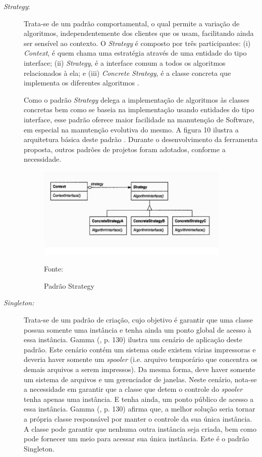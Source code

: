 \begin{description}
\item[\textit{Strategy}:]
Trata-se de um padrão comportamental, o qual permite a variação de algoritmos, independentemente dos clientes que os usam, facilitando ainda ser sensível ao contexto. O \textit{Strategy} é composto por três participantes: (i) \textit{Context}, é quem chama uma estratégia através de uma entidade do tipo interface; (ii) \textit{Strategy}, é a interface comum a todos os algoritmos relacionados à ela; e (iii) \textit{Concrete Strategy}, é a classe concreta que implementa os diferentes algoritmos \cite[p.294]{gamma2000}. 

Como o padrão \textit{Strategy} delega a implementação de algoritmos às classes concretas bem como se baseia na implementação usando entidades do tipo interface, esse padrão oferece maior facilidade na manutenção de Software, em especial na manutenção evolutiva do mesmo. A figura 10 ilustra a arquitetura básica deste padrão \cite[p.295]{gamma2000}. Durante o desenvolvimento da ferramenta proposta, outros padrões de projetos foram adotados, conforme a necessidade.

\begin{figure}[h!]
\centering
\label{f07}
\includegraphics[width=0.9\textwidth]{figuras/f07}
\caption{Padrão Strategy}{Fonte:\cite{gamma2000}}
\end{figure}
\FloatBarrier

\item[\textit{Singleton:}]

Trata-se de um padrão de criação, cujo objetivo é garantir que uma classe possua somente uma instância e tenha ainda um ponto global de acesso à essa instância. Gamma (\citeyear{gamma2000}, p. 130) ilustra um cenário de aplicação deste padrão. Este cenário contém um sistema onde existem várias impressoras e deveria haver somente um \textit{spooler} (i.e. arquivo temporário que concentra os demais arquivos a serem impressos). Da mesma forma, deve haver somente um sistema de arquivos e um gerenciador de janelas. Neste cenário, nota-se a necessidade em garantir que a classe que detem o controle do \textit{spooler} tenha apenas uma instância. E tenha ainda, um ponto público de acesso a essa instância. Gamma (\citeyear{gamma2000}, p. 130) afirma que, a melhor solução seria tornar a própria classe responsável por manter o controle da sua única instância. A classe pode garantir que nenhuma outra instância seja criada, bem como pode fornecer um meio para acessar sua única instância. Este é o padrão Singleton.


\end{description}
